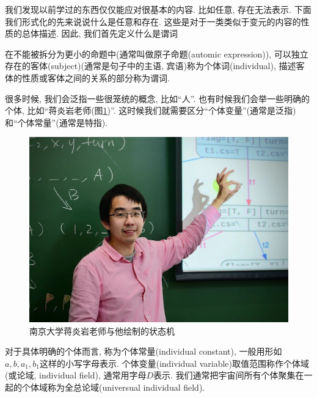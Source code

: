 我们发现以前学过的东西仅仅能应对很基本的内容. 比如任意, 存在无法表示. 下面我们形式化的先来说说什么是任意和存在. 这些是对于一类类似于变元的内容的性质的总体描述. 因此,  我们首先定义什么是谓词

\begin{definition}[谓词(predicate)]
	在不能被拆分为更小的命题中(通常叫做原子命题(automic expression)), 可以独立存在的客体(subject)(通常是句子中的主语, 宾语)称为个体词(individual), 描述客体的性质或客体之间的关系的部分称为谓词. 
\end{definition}

很多时候, 我们会泛指一些很笼统的概念, 比如``人''. 也有时候我们会举一些明确的个体, 比如``蒋炎岩老师(图\ref{fig:jyy})''. 这时候我们就需要区分``个体变量''(通常是泛指)和``个体常量''(通常是特指).

\begin{figure}[!htbp]
		\begin{center}
			\includegraphics[scale=0.2]{2-prop-logic/figs/jyy.jpeg}
		\end{center}
		
		\caption{南京大学蒋炎岩老师与他绘制的状态机}
		\label{fig:jyy}
	\end{figure}

\begin{definition}
	对于具体明确的个体而言, 称为个体常量(individual constant), 一般用形如$a,b,a_1,b_1$这样的小写字母表示. 个体变量(individual variable)取值范围称作个体域(或论域, individual field), 通常用字母$D$表示. 我们通常把宇宙间所有个体聚集在一起的个体域称为全总论域(universual individual field). 
\end{definition}  

